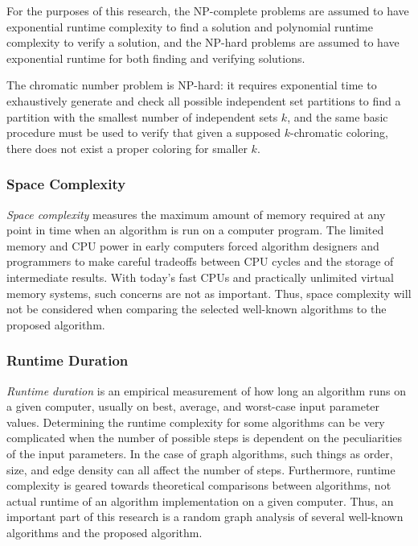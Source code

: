 For the purposes of this research, the NP-complete problems are assumed to have exponential runtime complexity to
find a solution and polynomial runtime complexity to verify a solution, and the NP-hard problems are assumed to
have exponential runtime for both finding and verifying solutions.

The chromatic number problem is NP-hard: it requires exponential time to exhaustively generate and check all
possible independent set partitions to find a partition with the smallest number of independent sets \(k\), and the
same basic procedure must be used to verify that given a supposed \(k\)-chromatic coloring, there does not exist a
proper coloring for smaller \(k\).

\subsubsection{Space Complexity}\label{sec:sub:sub:space}

\emph{Space complexity} measures the maximum amount of memory required at any point in time when an algorithm is
run on a computer program.  The limited memory and CPU power in early computers forced algorithm designers and
programmers to make careful tradeoffs between CPU cycles and the storage of intermediate results.  With today's
fast CPUs and practically unlimited virtual memory systems, such concerns are not as important.  Thus, space
complexity will not be considered when comparing the selected well-known algorithms to the proposed algorithm.

\subsubsection{Runtime Duration}\label{sec:sub:sub:duration}

\emph{Runtime duration} is an empirical measurement of how long an algorithm runs on a given computer, usually on
best, average, and worst-case input parameter values.  Determining the runtime complexity for some algorithms can
be very complicated when the number of possible steps is dependent on the peculiarities of the input parameters.
In the case of graph algorithms, such things as order, size, and edge density can all affect the number of steps.
Furthermore, runtime complexity is geared towards theoretical comparisons between algorithms, not actual runtime of
an algorithm implementation on a given computer.  Thus, an important part of this research is a random graph
analysis of several well-known algorithms and the proposed algorithm.


